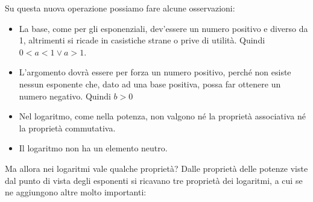 Su questa nuova operazione possiamo fare alcune osservazioni:

\begin{itemize}
 \item La base, come per gli esponenziali, dev'essere un numero positivo e 
diverso da 1, altrimenti si ricade in casistiche strane o prive di utilità.
Quindi \(0<a<1 \lor a>1\).
 \item L'argomento dovrà essere per forza un numero positivo, perché non 
esiste nessun esponente che, dato ad una base positiva, possa far ottenere 
un numero negativo. Quindi \(b>0\)
 \item Nel logaritmo, come nella potenza, non valgono né la proprietà 
associativa né la proprietà commutativa.
 \item Il logaritmo non ha un elemento neutro.
\end{itemize}

\noindent Ma allora nei logaritmi vale qualche proprietà? 
Dalle proprietà delle potenze viste dal punto di vista degli 
esponenti si ricavano tre proprietà dei logaritmi, a cui se ne aggiungono 
altre molto importanti:
% 

